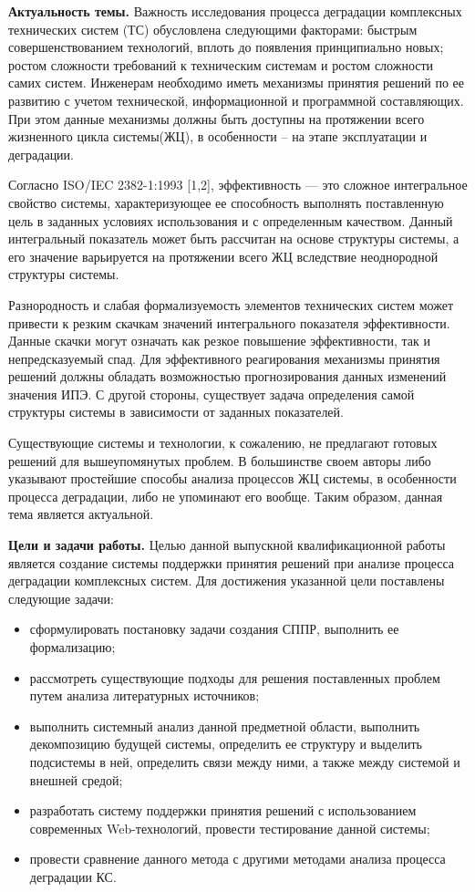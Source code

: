 
\textbf{Актуальность темы.}
Важность исследования процесса деградации комплексных технических систем (ТС) обусловлена следующими факторами: быстрым совершенствованием технологий, вплоть до появления принципиально новых; ростом сложности требований к техническим системам и ростом сложности самих систем. 
Инженерам необходимо иметь механизмы принятия решений по ее развитию с учетом технической, информационной и программной составляющих.
При этом данные механизмы должны быть доступны на протяжении всего жизненного цикла системы(ЖЦ), в особенности – на этапе эксплуатации и деградации.

Согласно ISO/IEC 2382-1:1993 [1,2], эффективность — это сложное интегральное свойство системы, характеризующее ее способность выполнять поставленную цель в заданных условиях использования и с определенным качеством. 
Данный интегральный показатель может быть рассчитан на основе структуры системы, а его значение варьируется на протяжении всего ЖЦ вследствие неоднородной структуры системы. 

Разнородность и слабая формализуемость элементов технических систем может привести к резким скачкам значений интегрального показателя эффективности. 
Данные скачки могут означать как резкое повышение эффективности, так и непредсказуемый спад. 
Для эффективного реагирования механизмы принятия решений должны обладать возможностью прогнозирования данных изменений значения ИПЭ. С другой стороны, существует задача определения самой структуры системы в зависимости от заданных показателей.

Существующие системы и технологии, к сожалению, не предлагают готовых решений для вышеупомянутых проблем.
В большинстве своем авторы либо указывают простейшие способы анализа процессов ЖЦ системы, в особенности процесса деградации, либо не упоминают его вообще. 
Таким образом, данная тема является актуальной.

\textbf{Цели и задачи работы.} 
Целью данной выпускной квалификационной работы является создание системы поддержки принятия решений при анализе процесса деградации комплексных систем.
Для достижения указанной цели поставлены следующие задачи: 
\begin{itemize}
  \item сформулировать постановку задачи создания СППР, выполнить ее формализацию;
  \item рассмотреть существующие подходы для решения поставленных проблем путем анализа литературных источников;
  \item выполнить системный анализ данной предметной области, выполнить декомпозицию будущей системы, определить ее структуру и выделить подсистемы в ней, определить связи между ними, а также между системой и внешней средой;
  \item разработать систему поддержки принятия решений с использованием современных Web-технологий, провести тестирование данной системы;
  \item провести сравнение данного метода с другими методами анализа процесса деградации КС.
\end{itemize}

